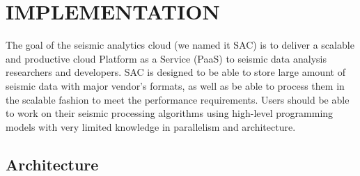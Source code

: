 %
%
%



\chapter{\uppercase{Implementation}}

The goal of the seismic analytics cloud (we named it SAC) is to deliver a scalable and productive cloud Platform as a Service (PaaS) to seismic data analysis researchers and developers. SAC is designed to be able to store large amount of seismic data with major vendor's formats, as well as be able to process them in the scalable fashion to meet the performance requirements. Users should be able to work on their seismic processing algorithms using high-level programming models with very limited knowledge in parallelism and architecture.

\section{Architecture}

